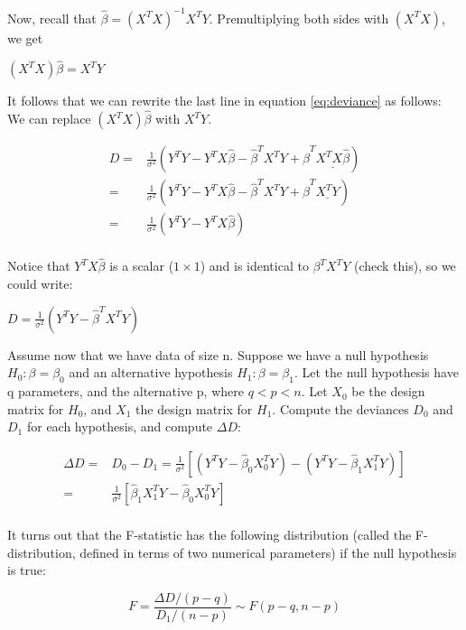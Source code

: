 \documentclass[12pt,]{krantz}
\begin{document}
Now, recall that \(\hat \beta = (X^T X)^{-1} X^T Y\). Premultiplying both sides with \((X^T X)\), we get

\((X^T X)\hat \beta = X^T Y\)

It follows that we can rewrite the last line in equation \ref{eq:deviance} as follows: We can replace \((X^T X)\hat \beta\) with
\(X^T Y\).

\begin{equation}
\begin{split}
D =& \frac{1}{\sigma^2} (Y^T Y - Y^TX\hat \beta - \hat\beta^TX^T Y + \hat\beta^T \underline{X^T  X\hat \beta})\\
=& \frac{1}{\sigma^2} (Y^T Y - Y^TX\hat \beta - \hat\beta^TX^T Y + \hat\beta^T \underline{X^T Y})\\
=& \frac{1}{\sigma^2} (Y^T Y - Y^TX\hat \beta) \\
\end{split}
\end{equation}

Notice that \(Y^TX\hat \beta\) is a scalar (\(1\times 1\)) and is identical to \(\beta^TX^T Y\) (check this), so we could write:

\(D= \frac{1}{\sigma^2} (Y^T Y - \hat \beta^T X^T Y)\)

Assume now that we have data of size n.
Suppose we have a null hypothesis \(H_0: \beta=\beta_0\) and an alternative hypothesis \(H_1: \beta=\beta_{1}\). Let the null hypothesis have q parameters, and the alternative p, where \(q<p<n\).
Let \(X_0\) be the design matrix for \(H_0\), and \(X_1\) the design matrix for \(H_1\).
Compute the deviances \(D_0\) and \(D_1\) for each hypothesis, and compute \(\Delta D\):

\begin{equation}
\begin{split}
\Delta D =& D_0 - D_1 = \frac{1}{\sigma^2} [(Y^TY - \hat \beta_0 X_0^T Y) -  (Y^TY - \hat \beta_1 X_1^T Y)]\\
=& \frac{1}{\sigma^2} [\hat \beta_1 X_1^T Y - \hat \beta_0 X_0^T Y]\\
\end{split}
\end{equation}

It turns out that the F-statistic has the following distribution (called the F-distribution, defined in terms of two numerical parameters) if the null hypothesis is true:

\begin{equation}
F=\frac{\Delta D/(p-q)}{D_1/(n-p)} \sim F(p-q,n-p)
\end{equation}
\end{document}
